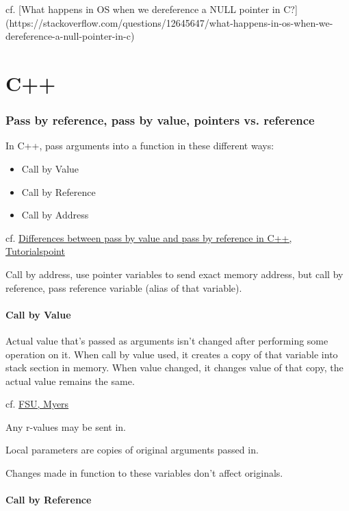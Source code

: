 \documentclass[10pt]{amsart}
\begin{document}
\begin{multicols*}{2}
cf. [What happens in OS when we dereference a NULL pointer in C?](https://stackoverflow.com/questions/12645647/what-happens-in-os-when-we-dereference-a-null-pointer-in-c)

\part{C++}  

\section{Pass by reference, pass by value, pointers vs. reference}

In C++, pass arguments into a function in these different ways:
\begin{itemize}
	\item Call by Value
	\item Call by Reference
	\item Call by Address
\end{itemize}
cf. \href{https://www.tutorialspoint.com/differences-between-pass-by-value-and-pass-by-reference-in-cplusplus}{Differences between pass by value and pass by reference in C++, Tutorialspoint}

Call by address, use pointer variables to send exact memory address, but call by reference, pass reference variable (alias of that variable).

\subsection{Call by Value}

Actual value that's passed as arguments isn't changed after performing some operation on it. When call by value used, it creates a copy of that variable into stack section in memory. When value changed, it changes value of that copy, the actual value remains the same.

cf. \href{https://www.cs.fsu.edu/~myers/c++/notes/references.html}{FSU, Myers}

Any r-values may be sent in.

Local parameters are copies of original arguments passed in.

Changes made in function to these variables don't affect originals.

\subsection{Call by Reference}


\end{multicols*}
\end{document}
